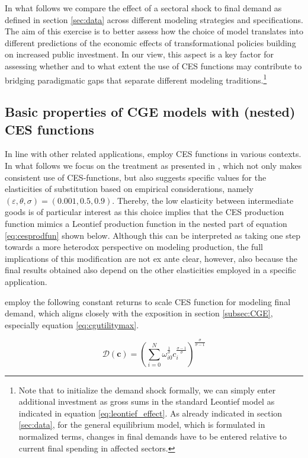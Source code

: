In what follows we compare the effect of a sectoral shock to final demand as defined in section \ref{sec:data} across different modeling strategies and specifications. The aim of this exercise is to better assess how the choice of model translates into different predictions of the economic effects of transformational policies building on increased public investment. In our view, this aspect is a key factor for assessing whether and to what extent the use of CES functions may contribute to bridging paradigmatic gaps that separate different modeling traditions.\footnote{Note that to initialize the demand shock formally, we can simply enter additional investment as gross sums in the standard Leontief model as indicated in equation \eqref{eq:leontief_effect}. As already indicated in section \ref{sec:data}, for the general equilibrium model, which is formulated in normalized terms, changes in final demands have to be entered relative to current final spending in affected sectors.}

\subsection{Basic properties of CGE models with (nested) CES functions} \label{subsec:introducingCES}

In line with other related applications, \citet{BF2019, BF2022} employ CES functions in various contexts. In what follows we focus on the treatment as presented in \citet{BF2019}, which not only makes consistent use of CES-functions, but also suggests specific values for the elasticities of substitution based on empirical considerations, namely $(\varepsilon,\theta,\sigma) = (0.001,0.5,0.9)$. Thereby, the low elasticity between intermediate goods is of particular interest as this choice implies that the CES production function mimics a Leontief production function in the nested part of equation \eqref{eq:cesprodfun} shown below. Although this can be interpreted as taking one step towards a more heterodox perspective on modeling production, the full implications of this modification are not ex ante clear, however, also because the final results obtained also depend on the other elasticities employed in a specific application.

\citet{BF2019} employ the following constant returns to scale CES function for modeling final demand, which aligns closely with the exposition in section \ref{subsec:CGE}, especially equation \eqref{eq:cgutilitymax}.

\begin{equation}
    \label{eq:cesdemand}
    \mathcal D(\mathbf c)= \left( \sum_{i=0}^N \omega_{i0}^{\frac 1 \sigma} c_i^{\frac {\sigma-1}{\sigma}} \right)^{\frac {\sigma}{\sigma-1}}
\end{equation}

